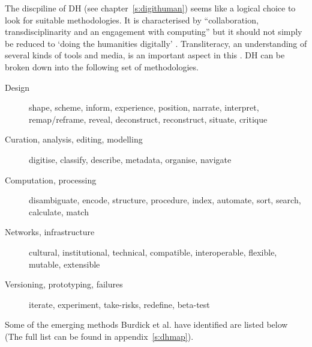 The discpiline of \ac{DH} (see chapter~\ref{s:digithuman}) seems like a logical choice to look for suitable methodologies. It is characterised by ``collaboration, transdisciplinarity and an engagement with computing'' \autocite{Burdick2012} but it should not simply be reduced to `doing the humanities digitally' \autocite{Burdick2012}. Transliteracy, an understanding of several kinds of tools and media, is an important aspect in this \autocite{Thomas2007}. \ac{DH} can be broken down into the following set of methodologies.

\begin{description}
  \item [Design] shape, scheme, inform, experience, position, narrate,
  					interpret, remap/reframe, reveal, deconstruct, reconstruct,
  					situate, critique
  \item [Curation, analysis, editing, modelling] digitise, classify, describe, metadata, organise, navigate
  \item [Computation, processing] disambiguate, encode, structure, procedure, index, automate, sort, search, calculate, match
  \item [Networks, infrastructure] cultural, institutional, technical, compatible, interoperable, flexible, mutable, extensible
  \item [Versioning, prototyping, failures]	iterate, experiment, take-risks, redefine, beta-test
\end{description}

Some of the emerging methods Burdick et al. have identified are listed below \citeyear{Burdick2012} (The full list can be found in appendix~\ref{s:dhmap}).

